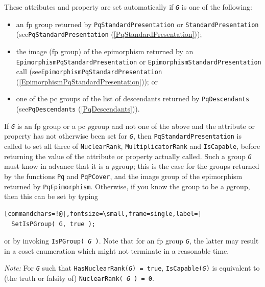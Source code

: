 \documentclass[a4paper,11pt]{report}
\begin{document}
{{{ These attributes and property are set automatically if \mbox{\texttt{\mdseries\slshape G}} is one of the following: 
\begin{itemize}
\item  an fp group returned by \texttt{PqStandardPresentation} or \texttt{StandardPresentation} (see{\nobreakspace}\texttt{PqStandardPresentation} (\ref{PqStandardPresentation})); 
\item  the image (fp group) of the epimorphism returned by an \texttt{EpimorphismPqStandardPresentation} or \texttt{EpimorphismStandardPresentation} call (see{\nobreakspace}\texttt{EpimorphismPqStandardPresentation} (\ref{EpimorphismPqStandardPresentation})); or 
\item  one of the pc groups of the list of descendants returned by \texttt{PqDescendants} (see{\nobreakspace}\texttt{PqDescendants} (\ref{PqDescendants})). 
\end{itemize}
 If \mbox{\texttt{\mdseries\slshape G}} is an fp group or a pc $p$\texttt{}group and not one of the above and the attribute or
property has not otherwise been set for \mbox{\texttt{\mdseries\slshape G}}, then \texttt{PqStandardPresentation} is called to set all three of \texttt{NuclearRank}, \texttt{MultiplicatorRank} and \texttt{IsCapable}, before returning the value of the attribute or property actually called.
Such a group \mbox{\texttt{\mdseries\slshape G}} must know in advance that it is a $p$\texttt{}group; this is the case for the groups returned by the
functions \texttt{Pq} and \texttt{PqPCover}, and the image group of the epimorphism returned by \texttt{PqEpimorphism}. Otherwise, if you know the group to be a $p$\texttt{}group, then this can be set by typing 
\begin{Verbatim}[commandchars=!@|,fontsize=\small,frame=single,label=]
  SetIsPGroup( G, true );
\end{Verbatim}
 or by invoking \texttt{IsPGroup( \mbox{\texttt{\mdseries\slshape G}} )}. Note that for an fp group \mbox{\texttt{\mdseries\slshape G}}, the latter may result in a coset enumeration which might not terminate in a
reasonable time. 

 \emph{Note:} For \mbox{\texttt{\mdseries\slshape G}} such that \texttt{HasNuclearRank(\mbox{\texttt{\mdseries\slshape G}}) = true}, \texttt{IsCapable(\mbox{\texttt{\mdseries\slshape G}})} is equivalent to (the truth or falsity of) \texttt{NuclearRank( \mbox{\texttt{\mdseries\slshape G}} ) = 0}. }

 }

}
\end{document}
